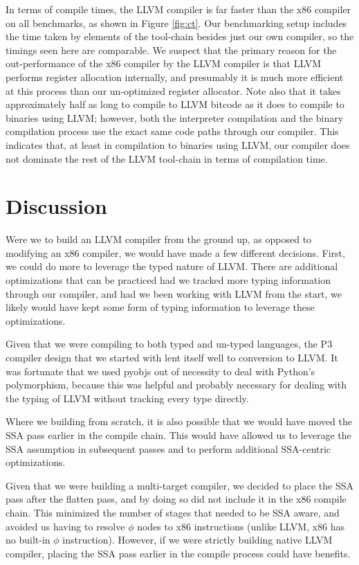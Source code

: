 \documentclass[11pt,twocolumn]{article}
\begin{document}
In terms of compile times, the LLVM compiler is far faster
than the x86 compiler on all benchmarks, as shown in Figure
\ref{fig:ct}. Our benchmarking setup includes the time taken by
elements of the tool-chain besides just our own compiler, so the
timings seen here are comparable. We suspect that the primary
reason for the out-performance of the x86 compiler by the LLVM compiler
is that LLVM performs register allocation internally, and presumably
it is much more efficient at this process than our un-optimized
register allocator. Note also that it takes approximately half as long
to compile to LLVM bitcode as it does to compile to binaries using
LLVM; however, both the interpreter compilation and the binary
compilation process use the exact same code paths through our
compiler. This indicates that, at least in compilation to binaries
using LLVM, our compiler does not dominate the rest of the LLVM
tool-chain in terms of compilation time.

\section{Discussion}

Were we to build an LLVM compiler from the ground up, as opposed to
modifying an x86 compiler, we would have made a few different
decisions. First, we could do more to leverage the typed nature of
LLVM. There are additional optimizations that can be practiced had we
tracked more typing information through our compiler, and had we been working
with LLVM from the start, we likely would have kept some form of typing
information to leverage these optimizations.

Given that we were compiling to both typed and un-typed languages, the
P3 compiler design that we started with lent itself well to conversion
to LLVM. It was fortunate that we used pyobjs out of necessity to deal
with Python's polymorphism, because this was helpful and probably
necessary for dealing with the typing of LLVM without tracking every
type directly.

Where we building from scratch, it is also possible that we would have
moved the SSA pass earlier in the compile chain. This would have
allowed us to leverage the SSA assumption in subsequent passes and to
perform additional SSA-centric optimizations.

Given that we were building a multi-target compiler, we decided to
place the SSA pass after the flatten pass, and by doing so did not
include it in the x86 compile chain. This minimized the number of
stages that needed to be SSA aware, and avoided us having to resolve
$\phi$ nodes to x86 instructions (unlike LLVM, x86 has no built-in $\phi$
instruction). However, if we were strictly building native LLVM compiler,
placing the SSA pass earlier in the compile process could have benefits.
\end{document}
